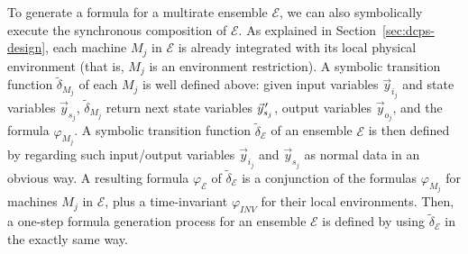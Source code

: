 \documentclass{sig-alternate}
\newcommand{\pvec}[1]{\vec{#1}\mkern2mu\vphantom{#1}} %
\begin{document}
To generate a formula for  a multirate ensemble $\mathcal{E}$,
we can also symbolically execute
the synchronous composition of $\mathcal{E}$.
As explained in Section~\ref{sec:dcps-design},
each machine $M_j$ in $\mathcal{E}$
is already integrated with its local physical environment
(that is, $M_j$ is an environment restriction).
A symbolic transition function $\tilde{\delta}_{M_j}$ of each $M_j$
is well defined above:
given input variables $\vec{y}_{i_j}$ and state variables $\vec{y}_{s_j}$,
$\tilde{\delta}_{M_j}$ return 
next state variables $\pvec{y}_{\!s_j}'$,
output variables $\vec{y}_{o_j}$,
and the formula $\varphi_{M_j}$.
A symbolic transition function $\tilde{\delta}_\mathcal{E}$
of an ensemble $\mathcal{E}$
is then defined
by regarding such input/output variables 
$\vec{y}_{i_j}$ and $\vec{y}_{s_j}$
as normal data   in an obvious way.
A resulting formula $\varphi_{\mathcal{E}}$ of $\tilde{\delta}_\mathcal{E}$
is a conjunction of the formulas $\varphi_{M_j}$ for machines $M_j$
in $\mathcal{E}$,
plus a time-invariant $\varphi_{\mathit{INV}}$
for their local environments.
Then,
a one-step formula generation process for an ensemble $\mathcal{E}$
is defined by using $\tilde{\delta}_\mathcal{E}$
in the exactly same way.
\end{document}
